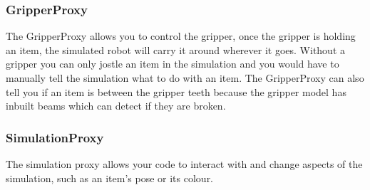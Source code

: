\documentclass[a4paper]{article}
\begin{document}
\subsubsection{GripperProxy}
The GripperProxy allows you to control the gripper, once the gripper is holding an item, the simulated robot will carry it around wherever it goes. Without a gripper you can only jostle an item in the simulation and you would have to manually tell the simulation what to do with an item. The GripperProxy can also tell you if an item is between the gripper teeth because the gripper model has inbuilt beams which can detect if they are broken. 


\subsubsection{SimulationProxy}
The simulation proxy allows your code to interact with and change aspects of the simulation, such as an item's pose or its colour. 
\end{document}
